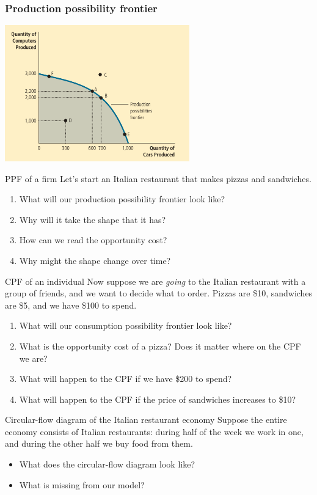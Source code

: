 \documentclass[aspectratio=169]{beamer}
\begin{document}
\begin{frame}
    \frametitle{Production possibility frontier}
    \centering
    \includegraphics[width = 0.6\textwidth,keepaspectratio]{model2.png}
\end{frame}

\begin{frame}{PPF of a firm}
    Let's start an Italian restaurant that makes pizzas and sandwiches.
    \begin{enumerate}
        \item What will our production possibility frontier look like?
        \item Why will it take the shape that it has?
        \item How can we read the opportunity cost?
        \item Why might the shape change over time?
    \end{enumerate}
\end{frame}

\begin{frame}{CPF of an individual}
    Now suppose we are \textit{going} to the Italian restaurant with a group of friends, and we want to decide what to order. Pizzas are \$10, sandwiches are \$5, and we have \$100 to spend.
    \begin{enumerate}
        \item What will our consumption possibility frontier look like?
        \item What is the opportunity cost of a pizza? Does it matter where on the CPF we are?
        \item What will happen to the CPF if we have \$200 to spend?
        \item What will happen to the CPF if the price of sandwiches increases to \$10?
    \end{enumerate}
\end{frame}

\begin{frame}{Circular-flow diagram of the Italian restaurant economy}
    Suppose the entire economy consists of Italian restaurants: during half of the week we work in one, and during the other half we buy food from them.

    \medskip

    \begin{itemize}
        \item What does the circular-flow diagram look like?
        \item What is missing from our model?
    \end{itemize}

\end{frame}
\end{document}
